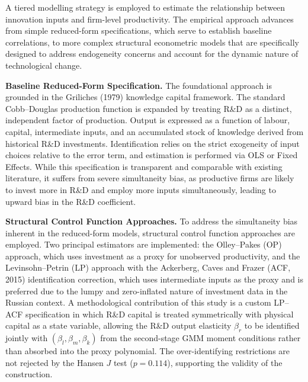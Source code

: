 \documentclass[a4paper, 12pt]{article}
\begin{document}
A tiered modelling strategy is employed to estimate the relationship between innovation inputs and firm-level productivity. The empirical approach advances from simple reduced-form specifications, which serve to establish baseline correlations, to more complex structural econometric models that are specifically designed to address endogeneity concerns and account for the dynamic nature of technological change.

\textbf{Baseline Reduced-Form Specification.} The foundational approach is grounded in the Griliches (1979) knowledge capital framework. The standard Cobb–Douglas production function is expanded by treating R\&D as a distinct, independent factor of production. Output is expressed as a function of labour, capital, intermediate inputs, and an accumulated stock of knowledge derived from historical R\&D investments. Identification relies on the strict exogeneity of input choices relative to the error term, and estimation is performed via OLS or Fixed Effects. While this specification is transparent and comparable with existing literature, it suffers from severe simultaneity bias, as productive firms are likely to invest more in R\&D and employ more inputs simultaneously, leading to upward bias in the R\&D coefficient.

\textbf{Structural Control Function Approaches.} To address the simultaneity bias inherent in the reduced-form models, structural control function approaches are employed. Two principal estimators are implemented: the Olley–Pakes (OP) approach, which uses investment as a proxy for unobserved productivity, and the Levinsohn–Petrin (LP) approach with the Ackerberg, Caves and Frazer (ACF, 2015) identification correction, which uses intermediate inputs as the proxy and is preferred due to the lumpy and zero-inflated nature of investment data in the Russian context. A methodological contribution of this study is a custom LP--ACF specification in which R\&D capital is treated symmetrically with physical capital as a state variable, allowing the R\&D output elasticity $\beta_r$ to be identified jointly with $(\beta_l, \beta_m, \beta_k)$ from the second-stage GMM moment conditions rather than absorbed into the proxy polynomial. The over-identifying restrictions are not rejected by the Hansen $J$ test ($p = 0.114$), supporting the validity of the construction.
\end{document}
